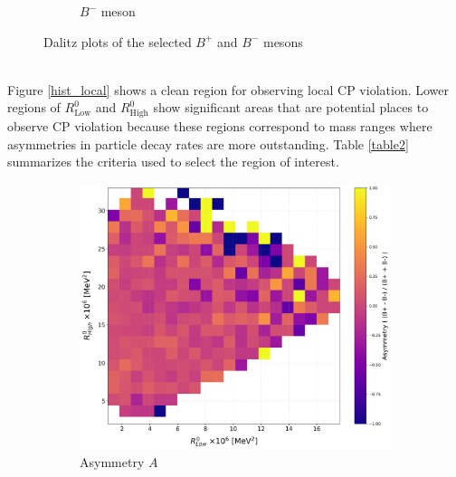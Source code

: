 \begin{figure}[H]
\begin{subfigure}[b]{0.48\textwidth}
           \caption{\(B^-\) meson}
        \end{subfigure}
        \caption{Dalitz plots of the selected \(B^+\) and \(B^-\) mesons}
        \label{hist_dalitz_sep}
    \end{figure}
    \\
    Figure \ref{hist_local} shows a clean region for observing local CP violation. Lower regions of \( R^0_{\text{Low}} \) and \( R^0_{\text{High}} \) show significant areas that are potential places to observe CP violation because these regions correspond to mass ranges where asymmetries in particle decay rates are more outstanding. Table \ref{table2} summarizes the criteria used to select the region of interest.
    \\

\begin{figure}[H]
    \centering
    \begin{subfigure}[b]{0.3\textwidth}
        \includegraphics[width=\textwidth]{Figure/hist_dalitz_asym.png}
        \caption{Asymmetry \(A\)}
        \label{fig:dalitz_asym}
    \end{subfigure}
    \hfill
    \begin{subfigure}[b]{0.3\textwidth}

\end{subfigure}
\end{figure}
